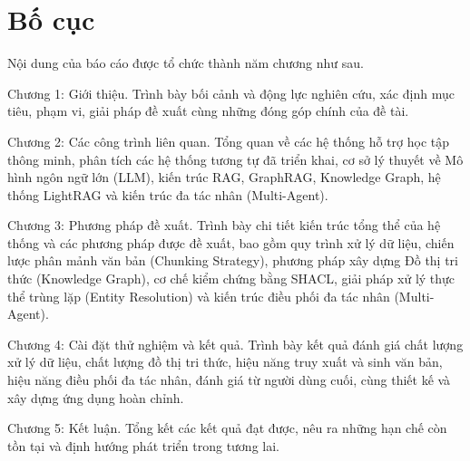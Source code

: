 \section{Bố cục}

Nội dung của báo cáo được tổ chức thành năm chương như sau.

Chương 1: Giới thiệu. Trình bày bối cảnh và động lực nghiên cứu, xác định mục tiêu, phạm vi, giải pháp đề xuất cùng những đóng góp chính của đề tài.

Chương 2: Các công trình liên quan. Tổng quan về các hệ thống hỗ trợ học tập thông minh, phân tích các hệ thống tương tự đã triển khai, cơ sở lý thuyết về Mô hình ngôn ngữ lớn (LLM), kiến trúc RAG, GraphRAG, Knowledge Graph, hệ thống LightRAG và kiến trúc đa tác nhân (Multi-Agent).

Chương 3: Phương pháp đề xuất. Trình bày chi tiết kiến trúc tổng thể của hệ thống và các phương pháp được đề xuất, bao gồm quy trình xử lý dữ liệu, chiến lược phân mảnh văn bản (Chunking Strategy), phương pháp xây dựng Đồ thị tri thức (Knowledge Graph), cơ chế kiểm chứng bằng SHACL, giải pháp xử lý thực thể trùng lặp (Entity Resolution) và kiến trúc điều phối đa tác nhân (Multi-Agent).

Chương 4: Cài đặt thử nghiệm và kết quả. Trình bày kết quả đánh giá chất lượng xử lý dữ liệu, chất lượng đồ thị tri thức, hiệu năng truy xuất và sinh văn bản, hiệu năng điều phối đa tác nhân, đánh giá từ người dùng cuối, cùng thiết kế và xây dựng ứng dụng hoàn chỉnh.

Chương 5: Kết luận. Tổng kết các kết quả đạt được, nêu ra những hạn chế còn tồn tại và định hướng phát triển trong tương lai.